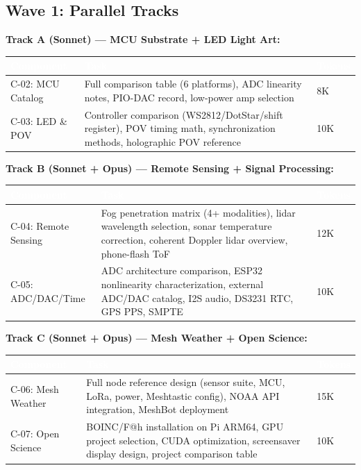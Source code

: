 \documentclass[11pt,letterpaper]{article}
\newcommand{\tableheader}[1]{\textbf{\sffamily\textcolor{white}{#1}}}
\begin{document}
\subsection{Wave 1: Parallel Tracks}

\textbf{Track A (Sonnet) --- MCU Substrate + LED Light Art:}

\begin{center}
\begin{tabularx}{\textwidth}{L{3cm}XC{2cm}}
\toprule
{}
\tableheader{Component} & \tableheader{Task} & \tableheader{Tokens} \\
\midrule
C-02: MCU Catalog & Full comparison table (6 platforms), ADC linearity notes, PIO-DAC record, low-power amp selection & 8K \\
C-03: LED \& POV & Controller comparison (WS2812/DotStar/shift register), POV timing math, synchronization methods, holographic POV reference & 10K \\
\bottomrule
\end{tabularx}
\end{center}

\textbf{Track B (Sonnet + Opus) --- Remote Sensing + Signal Processing:}

\begin{center}
\begin{tabularx}{\textwidth}{L{3cm}XC{2cm}}
\toprule
{}
\tableheader{Component} & \tableheader{Task} & \tableheader{Tokens} \\
\midrule
C-04: Remote Sensing & Fog penetration matrix (4+ modalities), lidar wavelength selection, sonar temperature correction, coherent Doppler lidar overview, phone-flash ToF & 12K \\
C-05: ADC/DAC/Time & ADC architecture comparison, ESP32 nonlinearity characterization, external ADC/DAC catalog, I2S audio, DS3231 RTC, GPS PPS, SMPTE & 10K \\
\bottomrule
\end{tabularx}
\end{center}

\textbf{Track C (Sonnet + Opus) --- Mesh Weather + Open Science:}

\begin{center}
\begin{tabularx}{\textwidth}{L{3cm}XC{2cm}}
\toprule
{}
\tableheader{Component} & \tableheader{Task} & \tableheader{Tokens} \\
\midrule
C-06: Mesh Weather & Full node reference design (sensor suite, MCU, LoRa, power, Meshtastic config), NOAA API integration, MeshBot deployment & 15K \\
C-07: Open Science & BOINC/F@h installation on Pi ARM64, GPU project selection, CUDA optimization, screensaver display design, project comparison table & 10K \\
\bottomrule
\end{tabularx}
\end{center}
\end{document}
